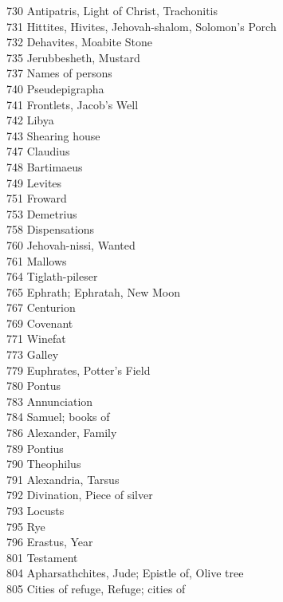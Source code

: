 730 \quad Antipatris, Light of Christ, Trachonitis\\
731 \quad Hittites, Hivites, Jehovah-shalom, Solomon’s Porch\\
732 \quad Dehavites, Moabite Stone\\
735 \quad Jerubbesheth, Mustard\\
737 \quad Names of persons\\
740 \quad Pseudepigrapha\\
741 \quad Frontlets, Jacob’s Well\\
742 \quad Libya\\
743 \quad Shearing house\\
747 \quad Claudius\\
748 \quad Bartimaeus\\
749 \quad Levites\\
751 \quad Froward\\
753 \quad Demetrius\\
758 \quad Dispensations\\
760 \quad Jehovah-nissi, Wanted\\
761 \quad Mallows\\
764 \quad Tiglath-pileser\\
765 \quad Ephrath; Ephratah, New Moon\\
767 \quad Centurion\\
769 \quad Covenant\\
771 \quad Winefat\\
773 \quad Galley\\
779 \quad Euphrates, Potter’s Field\\
780 \quad Pontus\\
783 \quad Annunciation\\
784 \quad Samuel; books of\\
786 \quad Alexander, Family\\
789 \quad Pontius\\
790 \quad Theophilus\\
791 \quad Alexandria, Tarsus\\
792 \quad Divination, Piece of silver\\
793 \quad Locusts\\
795 \quad Rye\\
796 \quad Erastus, Year\\
801 \quad Testament\\
804 \quad Apharsathchites, Jude; Epistle of, Olive tree\\
805 \quad Cities of refuge, Refuge; cities of\\
